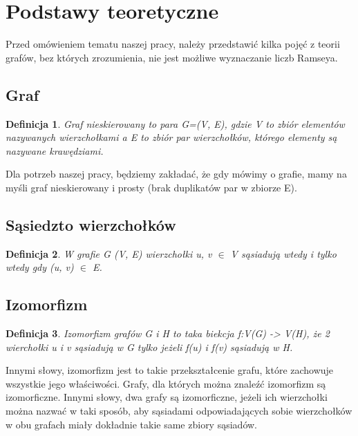 \documentclass[11pt]{article}
\newtheorem{definition}{Definicja}[section]
\begin{document}
\section{Podstawy teoretyczne}

  Przed omówieniem tematu naszej pracy, należy przedstawić kilka pojęć z teorii grafów, bez których zrozumienia, nie jest możliwe wyznaczanie liczb Ramseya.

  \subsection{Graf}
  \begin{definition}
    Graf nieskierowany to para G=(V, E), gdzie V to zbiór elementów nazywanych wierzchołkami a E to zbiór par wierzchołków, którego elementy są nazywane krawędziami.
  \end{definition}

  Dla potrzeb naszej pracy, będziemy zakładać, że gdy mówimy o grafie, mamy na myśli graf nieskierowany i prosty (brak duplikatów par w zbiorze E).
  
  \subsection{Sąsiedzto wierzchołków}
  \begin{definition}
    W grafie G (V, E) wierzchołki u, v $\in$ V sąsiadują wtedy i tylko wtedy gdy (u, v) $\in$ E.    
  \end{definition}

  \subsection{Izomorfizm}

  \begin{definition}
    Izomorfizm grafów G i H to taka biekcja f:V(G) -> V(H), że 2 wierchołki u i v sąsiadują w G tylko jeżeli f(u) i f(v) sąsiadują w H.
  \end{definition}

  Innymi słowy, izomorfizm jest to takie przekształcenie grafu, które zachowuje wszystkie jego właściwości. Grafy, dla których można znaleźć izomorfizm są izomorficzne. Innymi słowy, dwa grafy są izomorficzne, jeżeli ich wierzchołki można nazwać w taki sposób, 
  aby sąsiadami odpowiadających sobie wierzchołków w obu grafach miały dokładnie takie same zbiory sąsiadów.

\end{document}
